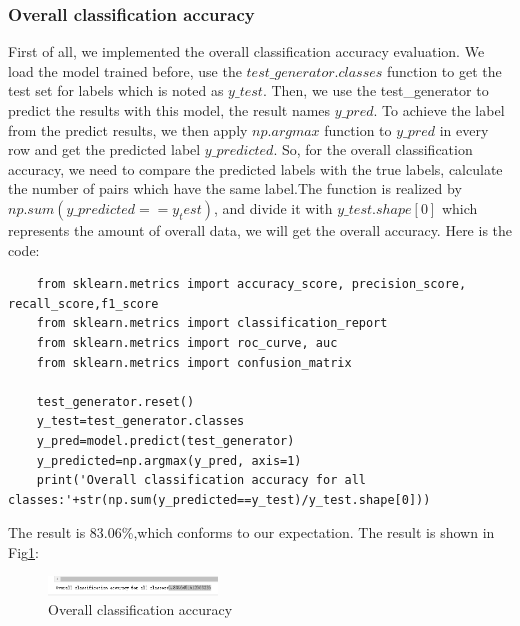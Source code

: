 \documentclass[conference]{IEEEtran}
\begin{document}
\subsubsection{Overall classification accuracy}
First of all, we implemented the overall classification accuracy evaluation. We load the model trained before, use the $test\_generator.classes$ function to get the test set for labels which is noted as $y\_test$.
Then, we use the test\_generator to predict the results with this model, the result names $y\_pred$. To achieve the label from the predict results, we then apply $np.argmax$ function to $y\_pred$ in every row and get the predicted label $y\_predicted$. 
So, for the overall classification accuracy, we need to compare the predicted labels with the true labels, calculate the number of pairs which have the same label.The function is realized by $np.sum(y\_predicted==y_test)$, and divide it with $y\_test.shape[0]$ which represents the amount of overall data, we will get the overall accuracy.
Here is the code:
\begin{lstlisting}
    from sklearn.metrics import accuracy_score, precision_score, recall_score,f1_score
    from sklearn.metrics import classification_report
    from sklearn.metrics import roc_curve, auc
    from sklearn.metrics import confusion_matrix

    test_generator.reset()
    y_test=test_generator.classes
    y_pred=model.predict(test_generator)
    y_predicted=np.argmax(y_pred, axis=1)
    print('Overall classification accuracy for all classes:'+str(np.sum(y_predicted==y_test)/y_test.shape[0]))
\end{lstlisting}
The result is 83.06\%,which conforms to our expectation. The result is shown in Fig\ref{Fig.t3q1}:
\begin{figure}[h] 
    \centering
    \includegraphics[width=0.4\textwidth]{./graphs/T3Q1a.png}
    \caption{Overall classification accuracy}
    \label{Fig.t3q1}
\end{figure}
\end{document}
